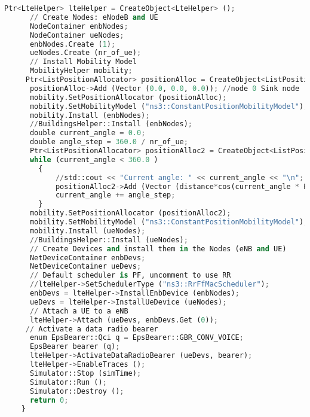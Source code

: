 \begin{lstlisting}[language=Python, label=py_script, basicstyle=\fontsize{10.5}{12.5}\selectfont]
	  Ptr<LteHelper> lteHelper = CreateObject<LteHelper> ();
	  // Create Nodes: eNodeB and UE
	  NodeContainer enbNodes;
	  NodeContainer ueNodes;
	  enbNodes.Create (1);
	  ueNodes.Create (nr_of_ue);
	  // Install Mobility Model
	  MobilityHelper mobility;
	 Ptr<ListPositionAllocator> positionAlloc = CreateObject<ListPositionAllocator> ();
	  positionAlloc->Add (Vector (0.0, 0.0, 0.0)); //node 0 Sink node
	  mobility.SetPositionAllocator (positionAlloc);
	  mobility.SetMobilityModel ("ns3::ConstantPositionMobilityModel");
	  mobility.Install (enbNodes);
	  //BuildingsHelper::Install (enbNodes); 
	  double current_angle = 0.0;
	  double angle_step = 360.0 / nr_of_ue;
	  Ptr<ListPositionAllocator> positionAlloc2 = CreateObject<ListPositionAllocator> ();
	  while (current_angle < 360.0 )
		{
			//std::cout << "Current angle: " << current_angle << "\n";
			positionAlloc2->Add (Vector (distance*cos(current_angle * PI / 180.0), distance*sin(current_angle * PI / 180.0), 0.0)); //Sender node x
			current_angle += angle_step;
		}
	  mobility.SetPositionAllocator (positionAlloc2);
	  mobility.SetMobilityModel ("ns3::ConstantPositionMobilityModel");
	  mobility.Install (ueNodes);
	  //BuildingsHelper::Install (ueNodes);
	  // Create Devices and install them in the Nodes (eNB and UE)
	  NetDeviceContainer enbDevs;
	  NetDeviceContainer ueDevs;
	  // Default scheduler is PF, uncomment to use RR
	  //lteHelper->SetSchedulerType ("ns3::RrFfMacScheduler");	
	  enbDevs = lteHelper->InstallEnbDevice (enbNodes);
	  ueDevs = lteHelper->InstallUeDevice (ueNodes);
	  // Attach a UE to a eNB
	  lteHelper->Attach (ueDevs, enbDevs.Get (0));
	 // Activate a data radio bearer
	  enum EpsBearer::Qci q = EpsBearer::GBR_CONV_VOICE;
	  EpsBearer bearer (q);
	  lteHelper->ActivateDataRadioBearer (ueDevs, bearer);
	  lteHelper->EnableTraces ();
	  Simulator::Stop (simTime);
	  Simulator::Run ();	
	  Simulator::Destroy ();
	  return 0;
	}

\end{lstlisting}
